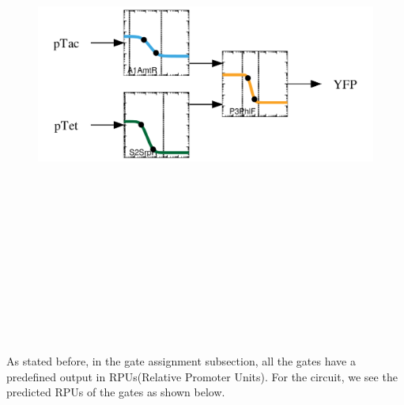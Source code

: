 \documentclass[11pt]{article}
\begin{document}
\begin{figure}[ht!]
\centering
\includegraphics[width=16cm,height=16cm,keepaspectratio]{ex_response.png}
\label{Response function for gate assignment }
\end{figure}
\\[\baselineskip]   
As stated before, in the gate assignment subsection, all the gates have a  predefined output in RPUs(Relative Promoter Units). For the circuit, we see the predicted RPUs of the gates as shown below.
\end{document}
